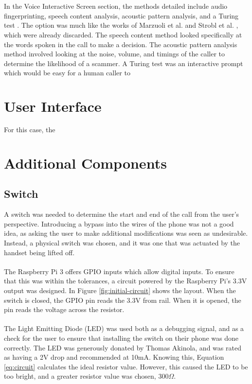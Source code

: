 \documentclass[main.tex]{subfiles}
\begin{document}
\\\\
In the Voice Interactive Screen section, the methods detailed include audio fingerprinting, speech content analysis, acoustic pattern analysis, and a Turing test \cite{cisco}. The option was much like the works of Marzuoli et al. \cite{marzuoli} and Strobl et al. \cite{strobl}, which were already discarded. The speech content method looked specifically at the words spoken in the call to make a decision. The acoustic pattern analysis method involved looking at the noise, volume, and timings of the caller to determine the likelihood of a scammer. A Turing test was an interactive prompt which would be easy for a human caller to

\section{User Interface}
For this case, the

\section{Additional Components}
\subsection{Switch}
A switch was needed to determine the start and end of the call from the user's perspective. Introducing a bypass into the wires of the phone was not a good idea, as asking the user to make additional modifications was seen as undesirable. Instead, a physical switch was chosen, and it was one that was actuated by the handset being lifted off.
\\\\
The Raspberry Pi 3 offers GPIO inputs which allow digital inputs. To ensure that this was within the tolerances, a circuit powered by the Raspberry Pi's 3.3V output was designed. In Figure \ref{fig:initial-circuit} shows the layout. When the switch is closed, the GPIO pin reads the 3.3V from rail. When it is opened, the pin reads the voltage across the resistor.
\\\\
The Light Emitting Diode (LED) was used both as a debugging signal, and as a check for the user to ensure that installing the switch on their phone was done correctly. The LED was generously donated by Thomas Akinola, and was rated as having a 2V drop and recommended at 10mA. Knowing this, Equation \ref{eq:circuit} calculates the ideal resistor value. However, this caused the LED to be too bright, and a greater resistor value was chosen, $300\Omega$.
\end{document}
